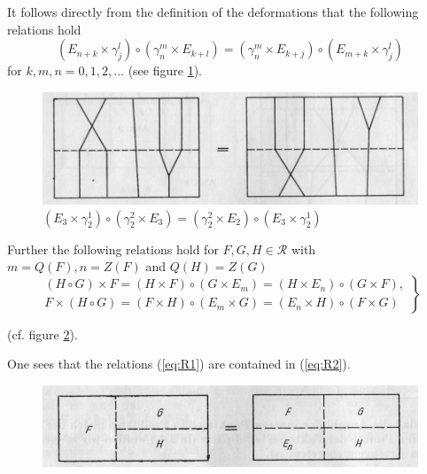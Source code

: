 \documentclass{article}
\begin{document}
It follows directly from the definition of the deformations that the following relations hold
\begin{equation}
\label{eq:R1}
\tag{R1}
(E_{n+k} \times \gamma_j^l) \circ (\gamma_n^m \times E_{k + l}) = (\gamma_n^m \times E_{k+j}) \circ (E_{m+k} \times \gamma_j^l) 
\end{equation}
for $k, m, n = 0, 1, 2, \ldots$ (see figure \ref{fig:figure10}).


\begin{figure}
\includegraphics[]{figure10.png}
  \centering
\caption{
  $(E_{3} \times \gamma_2^1) \circ (\gamma_2^2 \times E_{3}) = (\gamma_2^2 \times E_{2}) \circ (E_{3} \times \gamma_2^1)$ 
}
\label{fig:figure10}
\end{figure}

Further the following relations hold for $F, G, H \in \mathcal{R}$ with $m = Q(F), n = Z(F)$ and $Q(H)=Z(G)$
\begin{equation}
\label{eq:R2}
\tag{R2}
\left.
\begin{array}{c}
(H \circ G) \times F = (H \times F) \circ (G \times E_m) = (H \times E_n) \circ (G \times F), \\
F \times (H \circ G) = (F \times H) \circ (E_m \times G) = (E_n \times H) \circ (F \times G)
\end{array} 
\right\}
\end{equation}

(cf. figure \ref{fig:figure11}).

One sees that the relations (\ref{eq:R1}) are contained in (\ref{eq:R2}).


\begin{figure}
\includegraphics[]{figure11.png}
  \centering
\caption{}
\label{fig:figure11}
\end{figure}
\end{document}
